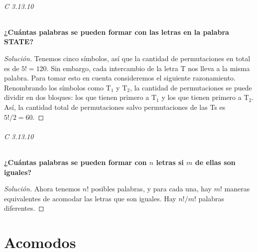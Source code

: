 \documentclass[spanish]{book}
\theoremstyle{definition}
\begin{document}
\paragraph{C 3.13.10} \textbf{¿Cuántas palabras se pueden formar con las letras en la palabra STATE?}
\begin{proof}[Solución]
	Tenemos cinco símbolos, así que la cantidad de permutaciones en total es de $5!=120$.  Sin embargo, cada intercambio de la letra T nos lleva a la misma palabra. Para tomar esto en cuenta consideremos el siguiente razonamiento. Renombrando los símbolos como $\text{T}_1$ y $\text{T}_2$, la cantidad de permutaciones se puede dividir en dos bloques: los que tienen primero a $\text{T}_1$ y los que tienen primero a $\text{T}_2$. Así, la cantidad total de permutaciones salvo permutaciones de las Ts es $5!/2=60$.
\end{proof}
\paragraph{C 3.13.10} \textbf{¿Cuántas palabras se pueden formar con $n$ letras si $m$ de ellas son iguales?}
\begin{proof}[Solución]
	Ahora tenemos $n!$ posibles palabras, y para cada una, hay $m!$ maneras equivalentes de acomodar las letras que son iguales. Hay $n!/m!$ palabras diferentes.
\end{proof}
\part{Acomodos}
\end{document}
